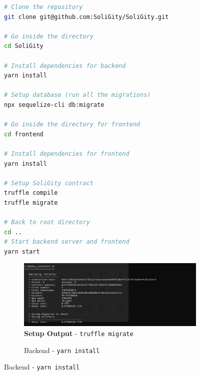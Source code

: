 \documentclass[12pt]{article}
\renewcommand{\_}{\kern-1.5pt\textunderscore\kern-1.5pt}
\begin{document}

\begin{figure}[H]
	\begin{minipage}[t]{0.4\linewidth}
		\begin{lstlisting}[language=bash]
# Clone the repository
git clone git@github.com:SoliGity/SoliGity.git

# Go inside the directory
cd SoliGity

# Install dependencies for backend
yarn install

# Setup database (run all the migrations)
npx sequelize-cli db:migrate

# Go inside the directory for frontend
cd frontend

# Install dependencies for frontend
yarn install

# Setup SoliGity contract
truffle compile
truffle migrate

# Back to root directory
cd ..
# Start backend server and frontend
yarn start
				\end{lstlisting}
				
				   	\begin{subfigure}[t]{1.2\textwidth}
	\captionsetup{justification   = raggedright,
              singlelinecheck = false}
		\centering
				\caption*{\textbf{Setup Output} - \texttt{truffle migrate}}
		\includegraphics[width=\textwidth]{graphs/07. truffle_migrate}
	\end{subfigure}
	\end{minipage}\hfill
	\begin{minipage}[t]{0.5\linewidth}
			\begin{subfigure}[b]{\textwidth}
				\captionsetup{justification   = raggedright,
              singlelinecheck = false}
			\centering
						\caption*{Backend - \texttt{yarn install}}


\end{subfigure}
\end{minipage}
\end{figure}
\end{document}
